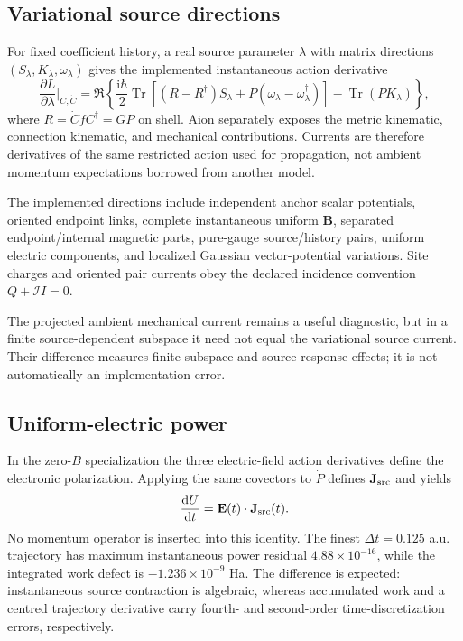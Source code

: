 \documentclass[11pt]{article}
\newcommand{\iu}{\mathrm{i}}
\newcommand{\dd}{\mathrm{d}}
\newcommand{\Tr}{\operatorname{Tr}}
\newcommand{\B}{\mathbf B}
\newcommand{\E}{\mathbf E}
\begin{document}
\subsection{Variational source directions}

For fixed coefficient history, a real source parameter $\lambda$ with matrix
directions $(S_\lambda,K_\lambda,\omega_\lambda)$ gives the implemented
instantaneous action derivative
\begin{equation}
 \frac{\partial L}{\partial\lambda}\bigg|_{C,\dot C}
 =\Re\left\{
 \frac{\iu\hbar}{2}\Tr[(R-R^\dagger)S_\lambda
 +P(\omega_\lambda-\omega_\lambda^\dagger)]
 -\Tr(PK_\lambda)\right\},
\end{equation}
where $R=\dot C fC^\dagger=GP$ on shell.  Aion separately exposes the metric
kinematic, connection kinematic, and mechanical contributions.  Currents are
therefore derivatives of the same restricted action used for propagation,
not ambient momentum expectations borrowed from another model.

The implemented directions include independent anchor scalar potentials,
oriented endpoint links, complete instantaneous uniform $\B$, separated
endpoint/internal magnetic parts, pure-gauge source/history pairs, uniform
electric components, and localized Gaussian vector-potential variations.
Site charges and oriented pair currents obey the declared incidence
convention $\dot Q+\mathcal I I=0$.

The projected ambient mechanical current remains a useful diagnostic, but in
a finite source-dependent subspace it need not equal the variational source
current.  Their difference measures finite-subspace and source-response
effects; it is not automatically an implementation error.

\subsection{Uniform-electric power}

In the zero-$B$ specialization the three electric-field action derivatives
define the electronic polarization.  Applying the same covectors to $\dot P$
defines $\mathbf J_{\rm src}$ and yields
\begin{equation}
 \frac{\dd U}{\dd t}=\E(t)\cdot\mathbf J_{\rm src}(t).
\end{equation}
No momentum operator is inserted into this identity.  The finest
$\Delta t=0.125$ a.u. trajectory has maximum instantaneous power residual
$4.88\times10^{-16}$, while the integrated work defect is
$-1.236\times10^{-9}$ Ha.  The difference is expected: instantaneous source
contraction is algebraic, whereas accumulated work and a centred trajectory
derivative carry fourth- and second-order time-discretization errors,
respectively.
\end{document}
